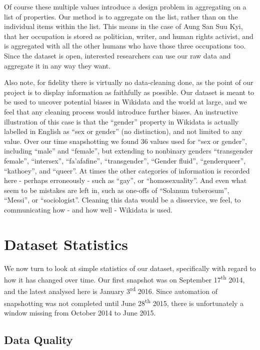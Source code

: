 \documentclass[letterpaper]{article}
\begin{document}
Of course these multiple values introduce a design problem in aggregating on a list of properties. Our method is to aggregate on the list, rather than on the individual items within the list. This means in the case of Aung San Suu Kyi, that her occupation is stored as politician, writer, and human rights activist, and is aggregated with all the other humans who have those three occupations too. Since the dataset is open, interested researchers can use our raw data and aggregate it in any way they want.

Also note, for fidelity there is virtually no data-cleaning done, as the point of our project is to display information as faithfully as possible. Our dataset is meant to be used to uncover potential biases in Wikidata and the world at large, and we feel that any cleaning process would introduce further biases. An instructive illustration of this case is that the ``gender'' property in Wikidata is actually labelled in English  as ``sex or gender'' (no distinction), and not limited to any value. Over our time snapshotting we found 36 values used for ``sex or gender'', including ``male'' and ``female'', but extending to nonbinary genders ``transgender female'', ``intersex'', ``fa'afafine'', ``transgender'', ``Gender fluid'',  ``genderqueer'', ``kathoey'', and ``queer''. At times the other categories of information is recorded here - perhaps erroneously - such as ``gay'', or ``homosexuality''. And even what seem to be mistakes are left in, such as one-offs of ``Solanum tuberosum'', ``Messi'', or ``sociologist''. Cleaning this data would be a disservice, we feel, to communicating how - and how well - Wikidata is used.

\section{Dataset Statistics}
We now turn to look at simple statistics of our dataset, specifically with regard to how it has changed over time. Our first snapshot was on September 17\textsuperscript{th} 2014, and the latest analysed here is January 3\textsuperscript{rd} 2016. Since automation of snapshotting was not completed until June 28\textsuperscript{th} 2015, there is unfortunately a window missing from October 2014 to June 2015. 

\subsection{Data Quality}
\end{document}
